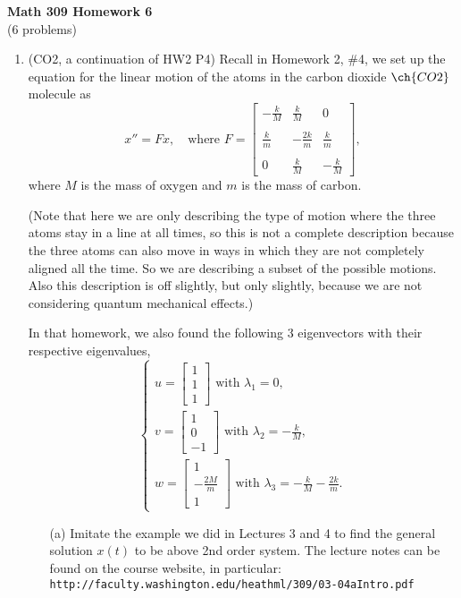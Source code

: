 \documentclass[11pt]{article}
\theoremstyle{definition}
\begin{document}
\begin{center}
\textbf{Math 309 Homework 6}\\
(6 problems)
\end{center}



\begin{enumerate}[leftmargin=*]

\item (CO2, a continuation of HW2 P4) Recall in Homework 2, \#4, we set up the equation  for  the linear motion of the atoms in the carbon dioxide $\ch{CO2}$ molecule as 
\[
x''= Fx, \quad \text{where }
F = \left[\begin{array}{ccc}
-\frac{k}{M}& \frac{k}{M} &0\\\\
\frac{k}{m}&-\frac{2k}{m}&\frac{k}{m} \\\\
0&\frac{k}{M} &-\frac{k}{M}
\end{array}\right],
\]
where $M$ is the mass of oxygen and $m$ is the mass of carbon. 

 (Note that here we are only describing the type of motion where the  three atoms stay in a line at all times, so this is not a complete description because the three atoms can also move in ways in which they are not completely aligned all the time.  So we are describing a subset of the possible motions.  Also this description is off slightly, but only slightly, because we are not considering quantum mechanical effects.) 
 
 In that homework, we also found the following 3 eigenvectors with their respective eigenvalues,
\[
\begin{cases}
u= \left[\begin{array}{c}
1\\
1\\
1
\end{array}\right] \text{ with } \lambda_1=0,\\
 v= \left[\begin{array}{c}
1\\
0\\
-1
\end{array}\right]\text{ with } \lambda_2=-\frac{k}{M}, \\
w= \left[\begin{array}{c}
1\\
-\frac{2M}{m}\\
1
\end{array}\right] \text{ with } \lambda_3=-\frac{k}{M}-\frac{2k}{m}.
\end{cases}
\]
\begin{itemize}
\item[(a)] Imitate the example we did in Lectures 3 and 4 to find the general solution $x(t)$ to be above 2nd order system.  The lecture notes can be found on the course website, in particular:
 \verb+http://faculty.washington.edu/heathml/309/03-04aIntro.pdf+
 

\end{itemize}
\end{enumerate}
\end{document}
